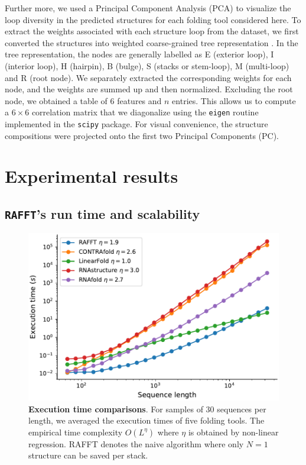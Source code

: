 Further more, we used a Principal Component Analysis (PCA) to visualize the loop diversity in the predicted structures for each folding tool considered here. To extract the weights associated with each structure loop from the dataset, we first converted the structures into weighted coarse-grained tree representation \cite{shapiro1990comparing}. In the tree representation, the nodes are generally labelled as E (exterior loop), I (interior loop), H (hairpin), B (bulge), S (stacks or stem-loop), M (multi-loop) and R (root node). We separately extracted the corresponding weights for each node, and the weights are summed up and then normalized. Excluding the root node, we obtained a table of $6$ features and \(n\) entries. This allows us to compute a \(6\times 6\) correlation matrix that we diagonalize using the \texttt{eigen} routine implemented in the \texttt{scipy} package. For visual convenience, the structure compositions were projected onto the first two Principal Components (PC). 


\section{Experimental results }
\subsection{ \texttt{RAFFT}'s run time and scalability}

\begin{figure}[t!]
	\centering
	\includegraphics[width=1.0\linewidth]{../res/images/rafft/All_CPU_time.pdf}
	\caption{\label{Fig:time_comp}\textbf{Execution time comparisons}. For samples of
		$30$ sequences per length, we averaged the execution times of five folding
		tools. The empirical time complexity $O(L^\eta)$ where $\eta$ is obtained by
		non-linear regression. RAFFT denotes the naive algorithm where only $N=1$ structure can be saved per stack.}
\end{figure}

